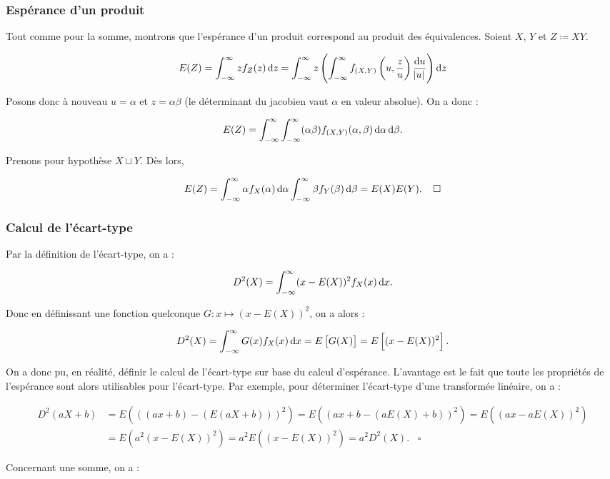 \documentclass{article}
\begin{document}
		\subsubsection{Espérance d'un produit}
			Tout comme pour la somme, montrons que l'espérance d'un produit correspond au produit des équivalences. Soient $X$, $Y$ et $Z \coloneqq XY$.

			\[E(Z) = \int_{-\infty}^\infty zf_Z(z)\dif z = \int_{-\infty}^\infty z\left(\int_{-\infty}^\infty f_{(X, Y)}\left(u, \frac zu\right)\frac {\dif u}{\abs u}\right) \dif z\]

			Posons donc à nouveau $u = \alpha$ et $z = \alpha\beta$ (le déterminant du jacobien vaut $\alpha$ en valeur absolue). On a donc :

			\[E(Z) = \int_{-\infty}^\infty\int_{-\infty}^\infty(\alpha\beta)f_{(X, Y)}(\alpha, \beta)\dif\alpha\dif\beta.\]

			Prenons pour hypothèse $X \sqcup Y$. Dès lors,

			\[E(Z) = \int_{-\infty}^\infty\alpha f_X(\alpha)\dif\alpha\int_{-\infty}^\infty\beta f_Y(\beta)\dif\beta = E(X)E(Y).\;\;\;\;\square\]

		\subsubsection{Calcul de l'écart-type}
			Par la définition de l'écart-type, on a :

			\[D^2(X) = \int_{-\infty}^\infty (x-E(X))^2f_X(x)\dif x.\]

			Donc en définissant une fonction quelconque $G : x \mapsto (x-E(X))^2$, on a alors :

			\[D^2(X) = \int_{-\infty}^\infty G(x)f_X(x)\dif x = E\left[G(X)\right] = E\left[(x-E(X))^2\right].\]

			On a donc pu, en réalité, définir le calcul de l'écart-type sur base du calcul d'espérance. L'avantage est le fait que toute les propriétés de l'espérance sont alors
			utilisables pour l'écart-type. Par exemple, pour déterminer l'écart-type d'une transformée linéaire, on a :

			\[\begin{aligned}
				D^2(aX+b) &= E(((ax+b) - (E(aX+b)))^2) = E((ax+b-(aE(X)+b))^2) = E((ax-aE(X))^2) \\
						  &= E(a^2(x-E(X))^2) = a^2E((x-E(X))^2) = a^2D^2(X).\;\;\;\square
			\end{aligned}\]

			Concernant une somme, on a :
\end{document}
